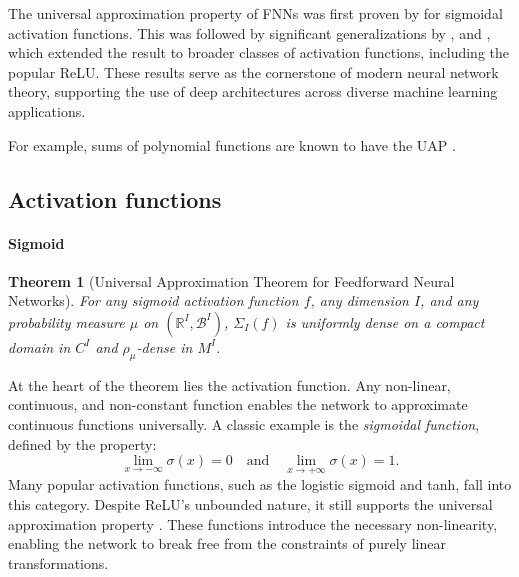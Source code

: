 \documentclass{article}
\newtheorem{theorem}{Theorem}
\newtheorem{corollary}{Corollary}[theorem]
\theoremstyle{definition} \newtheorem{definition}{Definition}
\theoremstyle{remark} \newtheorem{remark}{Remark}
\newcounter{ct}
\begin{document}
The universal approximation property of FNNs was first proven by \citep{cybenko1989approximation} for sigmoidal activation functions. This was followed by significant generalizations by \citep{hornik1989multilayer}, \citep{funahashi1989approximate} and \citep{hechtnielsen1992backpropagation}, which extended the result to broader classes of activation functions, including the popular ReLU.
These results serve as the cornerstone of modern neural network theory, supporting the use of deep architectures across diverse machine learning applications.

For example, sums of polynomial functions are known to have the UAP \citep{llavona1986approximation}.


\subsection{Activation functions} %
\paragraph{Sigmoid} %
\begin{theorem}[Universal Approximation Theorem for Feedforward Neural Networks\citep{hornik1989multilayer,schafer2007uap}]
For any sigmoid activation function \( f \), any dimension \( I \), and any probability measure \( \mu \) on \( (\mathbb{R}^I, \mathcal{B}^I) \), \( \Sigma_I(f) \) is uniformly dense on a compact domain in \( C^I \) and \( \rho_{\mu} \)-dense in \( M^I \).
\end{theorem}



At the heart of the theorem lies the activation function.
Any non-linear, continuous, and non-constant function enables the network to approximate continuous functions universally\citep{csaji2001approximation}.
A classic example is the \textit{sigmoidal function}, defined by the property:
\[
\lim_{x \to -\infty} \sigma(x) = 0 \quad \text{and} \quad \lim_{x \to +\infty} \sigma(x) = 1.
\]
Many popular activation functions, such as the logistic sigmoid and tanh, fall into this category.
Despite ReLU's unbounded nature, it still supports the universal approximation property \citep{yarotsky2017error}.
These functions introduce the necessary non-linearity, enabling the network to break free from the constraints of purely linear transformations.
\end{document}
